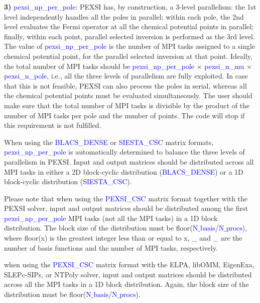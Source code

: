 \documentclass{report}
\newcommand{\tcb}[1]{\textcolor{blue}{#1}}
\begin{document}
\textbf{3)} \tcb{pexsi\_np\_per\_pole}: PEXSI has, by construction, a 3-level parallelism: the 1st level independently handles all the poles in parallel; within each pole, the 2nd level evaluates the Fermi operator at all the chemical potential points in parallel; finally, within each point, parallel selected inversion is performed as the 3rd level. The value of \tcb{pexsi\_np\_per\_pole} is the number of MPI tasks assigned to a single chemical potential point, for the parallel selected inversion at that point. Ideally, the total number of MPI tasks should be \tcb{pexsi\_np\_per\_pole} $\times$ \tcb{pexsi\_n\_mu} $\times$ \tcb{pexsi\_n\_pole}, i.e., all the three levels of parallelism are fully exploited. In case that this is not feasible, PEXSI can also process the poles in serial, whereas all the chemical potential points must be evaluated simultaneously. The user should make sure that the total number of MPI tasks is divisible by the product of the number of MPI tasks per pole and the number of points. The code will stop if this requirement is not fulfilled.

When using the \tcb{BLACS\_DENSE} or \tcb{SIESTA\_CSC} matrix formats, \tcb{pexsi\_np\_per\_pole} is automatically determined to balance the three levels of parallelism in PEXSI. Input and output matrices should be distributed across all MPI tasks in either a 2D block-cyclic distribution (\tcb{BLACS\_DENSE}) or a 1D block-cyclic distribution (\tcb{SIESTA\_CSC}).

Please note that when using the \tcb{PEXSI\_CSC} matrix format together with the PEXSI solver, input and output matrices should be distributed among the first \tcb{pexsi\_np\_per\_pole} MPI tasks (not all the MPI tasks) in a 1D block distribution. The block size of the distribution must be floor(\tcb{$\text{N}\_\text{basis}$}/\tcb{$\text{N}\_\text{procs}$}), where floor(x) is the greatest integer less than or equal to x, \tcb{\_} and \tcb{\_} are the number of basis functions and the number of MPI tasks, respectively.

when using the \tcb{PEXSI\_CSC} matrix format with the ELPA, libOMM, EigenExa, SLEPc-SIPs, or NTPoly solver, input and output matrices should be distributed across all the MPI tasks in a 1D block distribution. Again, the block size of the distribution must be floor(\tcb{$\text{N}\_\text{basis}$}/\tcb{$\text{N}\_\text{procs}$}).
\end{document}
